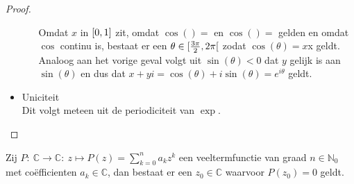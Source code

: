 \documentclass[main.tex]{subfiles}
\begin{document}
\begin{bpr}
\begin{proof}
\begin{itemize}
\begin{itemize}
        Omdat $x$ in $\interval{0}{1}$ zit, omdat $\cos()=$ en $\cos\left(\right)=$ gelden en omdat $\cos$ continu is, bestaat er een $\theta \in \interval[open right]{\frac{3\pi}{2}}{2\pi}$ zodat $\cos(\theta) = x$x geldt.
        Analoog aan het vorige geval volgt uit $\sin(\theta)<0$ dat $y$ gelijk is aan $\sin(\theta)$ en dus dat $x+yi = \cos(\theta) + i \sin(\theta) = e^{i\theta}$ geldt.
      \end{itemize}
    \item Uniciteit\\
      Dit volgt meteen uit de periodiciteit van $\exp$.
    \end{itemize}
  \end{proof}
\end{bpr}

\begin{bst}
  Zij $P:\ \mathbb{C} \rightarrow \mathbb{C}:\ z \mapsto P(z) = \sum_{k=0}^{n}a_{k}z^{k}$ een veeltermfunctie van graad $n\in \mathbb{N}_{0}$ met co\"efficienten $a_{k}\in \mathbb{C}$, dan bestaat er een $z_{0}\in \mathbb{C}$ waarvoor $P(z_{0})=0$ geldt.


\end{bst}
\end{document}
